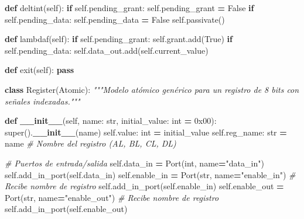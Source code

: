 \documentclass[12pt,oneside]{templates/unerthesis}
\newenvironment{Shaded}{\begin{snugshade}}{\end{snugshade}}
\newcommand{\BaseNTok}[1]{\textcolor[rgb]{0.00,0.00,0.81}{#1}}
\newcommand{\BuiltInTok}[1]{#1}
\newcommand{\CommentTok}[1]{\textcolor[rgb]{0.56,0.35,0.01}{\textit{#1}}}
\newcommand{\ControlFlowTok}[1]{\textcolor[rgb]{0.13,0.29,0.53}{\textbf{#1}}}
\newcommand{\FunctionTok}[1]{\textcolor[rgb]{0.13,0.29,0.53}{\textbf{#1}}}
\newcommand{\KeywordTok}[1]{\textcolor[rgb]{0.13,0.29,0.53}{\textbf{#1}}}
\newcommand{\NormalTok}[1]{#1}
\newcommand{\OperatorTok}[1]{\textcolor[rgb]{0.81,0.36,0.00}{\textbf{#1}}}
\newcommand{\StringTok}[1]{\textcolor[rgb]{0.31,0.60,0.02}{#1}}
\newcommand{\VariableTok}[1]{\textcolor[rgb]{0.00,0.00,0.00}{#1}}
\begin{document}
\begin{Shaded}
\begin{Highlighting}[]
    \KeywordTok{def}\NormalTok{ deltint(}\VariableTok{self}\NormalTok{):}
        \ControlFlowTok{if} \VariableTok{self}\NormalTok{.pending\_grant:}
            \VariableTok{self}\NormalTok{.pending\_grant }\OperatorTok{=} \VariableTok{False}
        \ControlFlowTok{if} \VariableTok{self}\NormalTok{.pending\_data:}
            \VariableTok{self}\NormalTok{.pending\_data }\OperatorTok{=} \VariableTok{False}
        \VariableTok{self}\NormalTok{.passivate()}
    
    \KeywordTok{def}\NormalTok{ lambdaf(}\VariableTok{self}\NormalTok{):}
        \ControlFlowTok{if} \VariableTok{self}\NormalTok{.pending\_grant:}
            \VariableTok{self}\NormalTok{.grant.add(}\VariableTok{True}\NormalTok{)}
        \ControlFlowTok{if} \VariableTok{self}\NormalTok{.pending\_data:}
            \VariableTok{self}\NormalTok{.data\_out.add(}\VariableTok{self}\NormalTok{.current\_value)}
    
    \KeywordTok{def}\NormalTok{ exit(}\VariableTok{self}\NormalTok{):}
        \ControlFlowTok{pass}


\KeywordTok{class}\NormalTok{ Register(Atomic):}
    \CommentTok{"""Modelo atómico genérico para un registro de 8 bits con}
\CommentTok{     señales indexadas."""}
    
    \KeywordTok{def} \FunctionTok{\_\_init\_\_}\NormalTok{(}\VariableTok{self}\NormalTok{, name: }\BuiltInTok{str}\NormalTok{, initial\_value: }\BuiltInTok{int} \OperatorTok{=} \BaseNTok{0x00}\NormalTok{):}
        \BuiltInTok{super}\NormalTok{().}\FunctionTok{\_\_init\_\_}\NormalTok{(name)}
        \VariableTok{self}\NormalTok{.value: }\BuiltInTok{int} \OperatorTok{=}\NormalTok{ initial\_value}
        \VariableTok{self}\NormalTok{.reg\_name: }\BuiltInTok{str} \OperatorTok{=}\NormalTok{ name  }
        \CommentTok{\# Nombre del registro (AL, BL, CL, DL)}
        
        \CommentTok{\# Puertos de entrada/salida}
        \VariableTok{self}\NormalTok{.data\_in }\OperatorTok{=}\NormalTok{ Port(}\BuiltInTok{int}\NormalTok{, name}\OperatorTok{=}\StringTok{"data\_in"}\NormalTok{)}
        \VariableTok{self}\NormalTok{.add\_in\_port(}\VariableTok{self}\NormalTok{.data\_in)}
        \VariableTok{self}\NormalTok{.enable\_in }\OperatorTok{=}\NormalTok{ Port(}\BuiltInTok{str}\NormalTok{, name}\OperatorTok{=}\StringTok{"enable\_in"}\NormalTok{)  }
        \CommentTok{\# Recibe nombre de registro}
        \VariableTok{self}\NormalTok{.add\_in\_port(}\VariableTok{self}\NormalTok{.enable\_in)}
        \VariableTok{self}\NormalTok{.enable\_out }\OperatorTok{=}\NormalTok{ Port(}\BuiltInTok{str}\NormalTok{, name}\OperatorTok{=}\StringTok{"enable\_out"}\NormalTok{) }
        \CommentTok{\# Recibe nombre de registro}
        \VariableTok{self}\NormalTok{.add\_in\_port(}\VariableTok{self}\NormalTok{.enable\_out)}
        

\end{Highlighting}
\end{Shaded}
\end{document}
